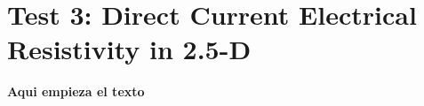 \documentclass[../Dissertation]{subfiles}
\begin{document}
\section{Test 3: Direct Current Electrical Resistivity in 2.5-D}\label{sec5:3D2D_resistivity}
  \textbf{Aqui empieza el texto} 
  \lipsum[1]

\end{document}
